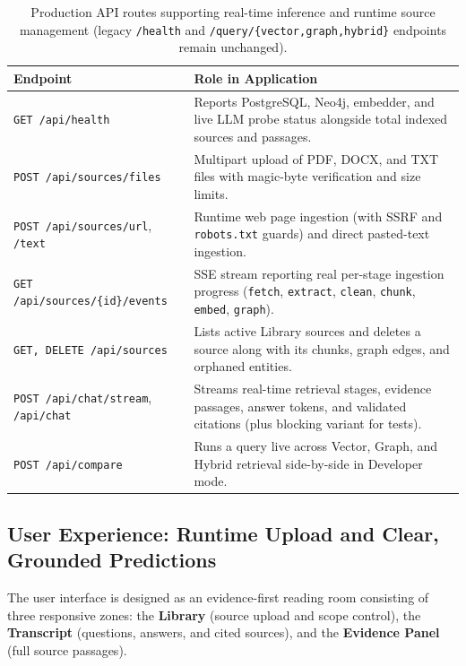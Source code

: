 \documentclass[11pt,a4paper]{article}
\begin{document}
\begin{table}[H]
\centering
\caption{Production API routes supporting real-time inference and runtime source management (legacy \texttt{/health} and \texttt{/query/\{vector,graph,hybrid\}} endpoints remain unchanged).}
\label{tab:d3-api}
\small
\begin{tabularx}{\textwidth}{@{}L{5.0cm} Y@{}}
\toprule
\textbf{Endpoint} & \textbf{Role in Application} \\
\midrule
\texttt{GET /api/health} & Reports PostgreSQL, Neo4j, embedder, and live LLM probe status alongside total indexed sources and passages. \\
\texttt{POST /api/sources/files} & Multipart upload of PDF, DOCX, and TXT files with magic-byte verification and size limits. \\
\texttt{POST /api/sources/url}, \texttt{/text} & Runtime web page ingestion (with SSRF and \texttt{robots.txt} guards) and direct pasted-text ingestion. \\
\texttt{GET /api/sources/\{id\}/events} & SSE stream reporting real per-stage ingestion progress (\texttt{fetch}, \texttt{extract}, \texttt{clean}, \texttt{chunk}, \texttt{embed}, \texttt{graph}). \\
\texttt{GET, DELETE /api/sources} & Lists active Library sources and deletes a source along with its chunks, graph edges, and orphaned entities. \\
\texttt{POST /api/chat/stream}, \texttt{/api/chat} & Streams real-time retrieval stages, evidence passages, answer tokens, and validated citations (plus blocking variant for tests). \\
\texttt{POST /api/compare} & Runs a query live across Vector, Graph, and Hybrid retrieval side-by-side in Developer mode. \\
\bottomrule
\end{tabularx}
\end{table}

\subsection{User Experience: Runtime Upload and Clear, Grounded Predictions}
The user interface is designed as an evidence-first reading room consisting of three responsive zones: the \textbf{Library} (source upload and scope control), the \textbf{Transcript} (questions, answers, and cited sources), and the \textbf{Evidence Panel} (full source passages).
\end{document}
